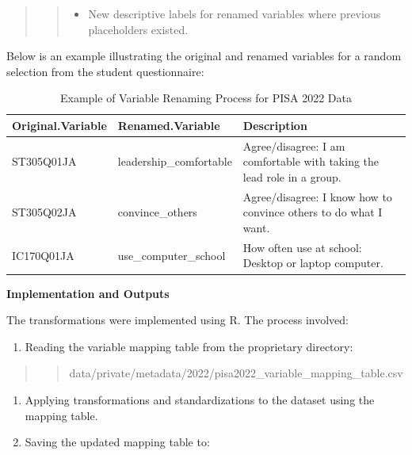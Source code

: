 \documentclass[
]{article}
\providecommand{\tightlist}{%
  \setlength{\itemsep}{0pt}\setlength{\parskip}{0pt}}
\begin{document}
\begin{quote}
\begin{quote}
\begin{itemize}
\tightlist
\item
  New descriptive labels for renamed variables where previous
  placeholders existed.
\end{itemize}
\end{quote}
\end{quote}

Below is an example illustrating the original and renamed variables for
a random selection from the student questionnaire:

\begin{longtable}[t]{>{\raggedright\arraybackslash}p{3cm}>{\raggedright\arraybackslash}p{4cm}>{\raggedright\arraybackslash}p{8cm}}
\caption{\label{tab:variable renaming}Example of Variable Renaming Process for PISA 2022 Data}\\
\toprule
Original.Variable & Renamed.Variable & Description\\
\midrule
ST305Q01JA & leadership\_comfortable & Agree/disagree: I am comfortable with taking the lead role in a group.\\
ST305Q02JA & convince\_others & Agree/disagree: I know how to convince others to do what I want.\\
IC170Q01JA & use\_computer\_school & How often use at school: Desktop or laptop computer.\\
\bottomrule
\end{longtable}

\textbf{Implementation and Outputs}

The transformations were implemented using R. The process involved:

\begin{enumerate}
\def\labelenumi{\arabic{enumi}.}
\tightlist
\item
  Reading the variable mapping table from the proprietary directory:
\end{enumerate}

\begin{quote}
\begin{quote}
data/private/metadata/2022/pisa2022\_variable\_mapping\_table.csv
\end{quote}
\end{quote}

\begin{enumerate}
\def\labelenumi{\arabic{enumi}.}
\setcounter{enumi}{1}
\item
  Applying transformations and standardizations to the dataset using the
  mapping table.
\item
  Saving the updated mapping table to:
\end{enumerate}
\end{document}
